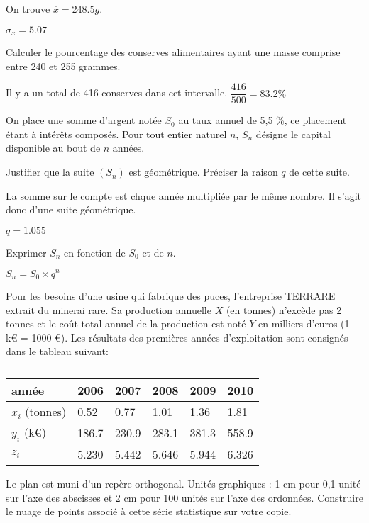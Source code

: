 \documentclass[a4paper,12pt]{scrartcl}
\begin{document}
On trouve $\overline{x} = 248.5g$.

$\sigma_x = 5.07$

\question{}
Calculer le pourcentage des conserves alimentaires ayant une masse comprise entre 240 et 255 grammes. 

Il y a un total de 416 conserves dans cet intervalle. $\dfrac{416}{500} = 83.2\%$


On place une somme d'argent notée $S_0$ au taux annuel de 5,5 \%, ce placement étant à intérêts composés.
Pour tout entier naturel $n$, $S_n$ désigne le capital disponible au bout de $n$ années.

\question{}
Justifier que la suite $(S_n)$ est géométrique. Préciser la raison $q$ de cette suite.

La somme sur le compte est chque année multipliée par le même nombre. Il s'agit donc d'une suite géométrique.

$q = 1.055$

\question{}
Exprimer $S_n$ en fonction de $S_0$ et de $n$.

$S_n = S_0 \times q^n$

\exo{}

Pour les besoins d'une usine qui fabrique des puces, l'entreprise TERRARE extrait du minerai rare. Sa production annuelle $X$ (en
tonnes) n'excède pas 2 tonnes et le coût total annuel de la production est noté $Y$ en milliers d'euros (1 k€ = 1000 €).
Les résultats des premières années d'exploitation sont consignés dans le tableau suivant:

\begin{table}[h]
\centering
\caption{}
\label{tableau_2}
\begin{tabular}{|l|l|l|l|l|l|}
\hline
année          & 2006  & 2007  & 2008  & 2009  & 2010  \\ \hline
$x_i$ (tonnes) & 0.52  & 0.77  & 1.01  & 1.36  & 1.81  \\ \hline
$y_i$ (k€)     & 186.7 & 230.9 & 283.1 & 381.3 & 558.9 \\ \hline
$z_i$&5.230&5.442&5.646&5.944&6.326 \\ \hline
\end{tabular}
\end{table}

\question{}
Le plan est muni d'un repère orthogonal.
Unités graphiques : 1 cm pour 0,1 unité sur l'axe des abscisses et 2 cm pour 100 unités sur l'axe des ordonnées.
Construire le nuage de points associé à cette série statistique sur votre copie. 
\end{document}
